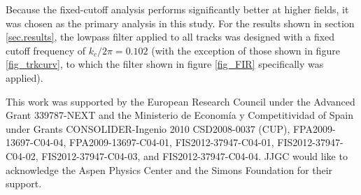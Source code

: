 \documentclass{JINST}
\begin{document}
Because the fixed-cutoff analysis performs significantly better at higher fields, it was chosen as the primary 
analysis in this study.  For the results shown in section \ref{sec.results}, the lowpass filter applied to all tracks 
was designed with a fixed cutoff frequency of $k_{c}/2\pi = 0.102$ (with the exception of those shown in figure \ref{fig_trkcurv}, to which the filter shown in figure \ref{fig_FIR} specifically was applied).




\acknowledgments

This work was supported by the European Research Council under the Advanced Grant 339787-NEXT and the Ministerio de Econom\'{i}a y Competitividad of Spain under Grants CONSOLIDER-Ingenio 2010 CSD2008-0037 (CUP), FPA2009-13697-C04-04, FPA2009-13697-C04-01, FIS2012-37947-C04-01, FIS2012-37947-C04-02, FIS2012-37947-C04-03, and FIS2012-37947-C04-04.  JJGC would like to acknowledge the Aspen Physics Center and the Simons Foundation for their support.


\end{document}
